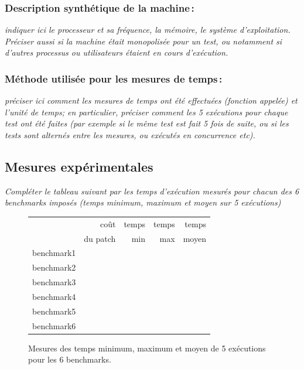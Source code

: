 \documentclass[a4paper, 10pt, french]{article}
\begin{document}
    \subsubsection{Description synthétique de la machine\,:} 
      {\em indiquer ici le  processeur et sa fréquence, la mémoire, le système d'exploitation. 
       Préciser aussi si la machine était monopolisée pour un test, ou notamment si 
       d'autres processus ou utilisateurs étaient en cours d'exécution. 
      } 

    \subsubsection{Méthode utilisée pour les mesures de temps\,: } 
      {\em préciser ici  comment les mesures de temps ont été effectuées (fonction appelée) et l'unité de temps; en particulier, 
       préciser comment les 5 exécutions pour chaque test ont été faites (par exemple si le même test est fait 5 fois de suite, ou si les tests sont alternés entre
       les mesures, ou exécutés en concurrence etc). 
      }

  \subsection{Mesures expérimentales}
    {\em Compléter le tableau suivant par les temps d'exécution mesurés pour chacun des 6 benchmarks imposés
              (temps minimum, maximum et moyen sur 5 exécutions)
    }

    \begin{figure}[h]
      \begin{center}
        \begin{tabular}{|l||r||r|r|r||}
          \hline
          \hline
            & coût         & temps     & temps   & temps \\
            & du patch     & min       & max     & moyen \\
          \hline
          \hline
            benchmark1 &      &     &     &     \\
          \hline
            benchmark2 &      &     &     &     \\
          \hline
            benchmark3 &      &     &     &     \\
          \hline
            benchmark4 &      &     &     &     \\
          \hline
            benchmark5 &      &     &     &     \\
          \hline
            benchmark6 &      &     &     &     \\
          \hline
          \hline
        \end{tabular}
        \caption{Mesures des temps minimum, maximum et moyen de 5 exécutions pour les 6 benchmarks.}
        \label{table-temps}
      \end{center}
    \end{figure}
\end{document}
